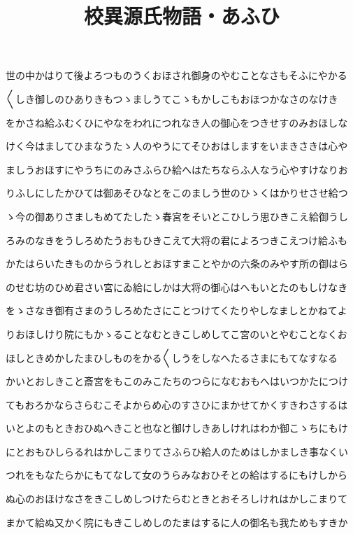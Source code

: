 \documentclass[a4paper,11pt,landscape]{ltjtarticle}
\title{校異源氏物語・あふひ}
\date{}
\begin{document}
\maketitle

世の中かはりて後よろつものうくおほされ御身のやむことなさもそふにやかる
\par\medskip
〱しき御しのひありきもつゝましうてこゝもかしこもおほつかなさのなけき
\par\medskip
をかさね給ふむくひにやなをわれにつれなき人の御心をつきせすのみおほしな
\par\medskip
けく今はましてひまなうたゝ人のやうにてそひおはしますをいまきさきは心や
\par\medskip
ましうおほすにやうちにのみさふらひ給へはたちならふ人なう心やすけなりお
\par\medskip
りふしにしたかひては御あそひなとをこのましう世のひゝくはかりせさせ給つ
\par\medskip
ゝ今の御ありさましもめてたしたゝ春宮をそいとこひしう思ひきこえ給御うし
\par\medskip
ろみのなきをうしろめたうおもひきこえて大将の君によろつきこえつけ給ふも
\par\medskip
かたはらいたきものからうれしとおほすまことやかの六条のみやす所の御はら
\par\medskip
のせむ坊のひめ君さい宮にゐ給にしかは大将の御心はへもいとたのもしけなき
\par\medskip
をゝさなき御有さまのうしろめたさにことつけてくたりやしなましとかねてよ
\par\medskip
りおほしけり院にもかゝることなむときこしめしてこ宮のいとやむことなくお
\par\medskip
ほしときめかしたまひしものをかる〱しうをしなへたるさまにもてなすなる
\par\medskip
かいとおしきこと斎宮をもこのみこたちのつらになむおもへはいつかたにつけ
\par\medskip
てもおろかならさらむこそよからめ心のすさひにまかせてかくすきわさするは
\par\medskip
いとよのもときおひぬへきこと也なと御けしきあしけれはわか御こゝちにもけ
\par\medskip
にとおもひしらるれはかしこまりてさふらひ給人のためはしかましき事なくい
\par\medskip
つれをもなたらかにもてなして女のうらみなおひそとの給はするにもけしから
\par\medskip
ぬ心のおほけなさをきこしめしつけたらむときとおそろしけれはかしこまりて
\par\medskip
まかて給ぬ又かく院にもきこしめしのたまはするに人の御名も我ためもすきか
\end{document}

